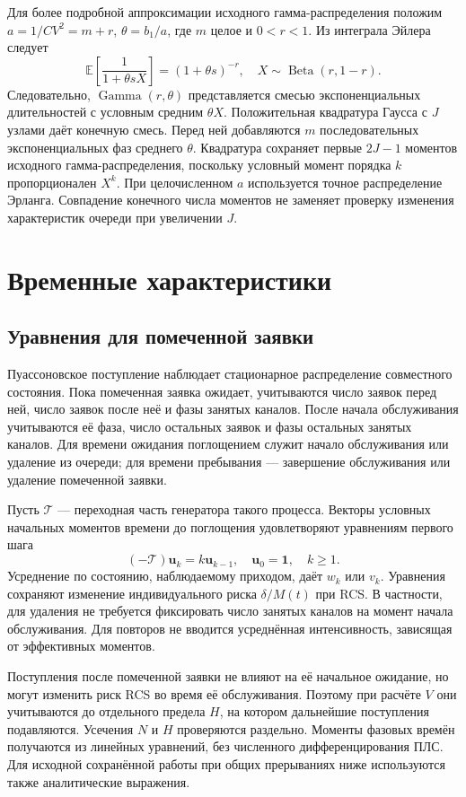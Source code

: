 \documentclass[a4paper,12pt]{article}
\begin{document}
Для более подробной аппроксимации исходного гамма-распределения положим \(a=1/CV^2=m+r\), \(\theta=b_1/a\), где \(m\) целое и \(0<r<1\). Из интеграла Эйлера \cite{nistdlmf} следует
\[
\mathbb E\!\left[\frac{1}{1+\theta sX}\right]=(1+\theta s)^{-r},\quad
X\sim\operatorname{Beta}(r,1-r).
\]
Следовательно, \(\operatorname{Gamma}(r,\theta)\) представляется смесью экспоненциальных длительностей с условным средним \(\theta X\). Положительная квадратура Гаусса с \(J\) узлами даёт конечную смесь. Перед ней добавляются \(m\) последовательных экспоненциальных фаз среднего \(\theta\). Квадратура сохраняет первые \(2J-1\) моментов исходного гамма-распределения, поскольку условный момент порядка \(k\) пропорционален \(X^k\). При целочисленном \(a\) используется точное распределение Эрланга. Совпадение конечного числа моментов не заменяет проверку изменения характеристик очереди при увеличении \(J\).

\section{Временные характеристики}\label{sec:times}
\subsection{Уравнения для помеченной заявки}
Пуассоновское поступление наблюдает стационарное распределение совместного состояния. Пока помеченная заявка ожидает, учитываются число заявок перед ней, число заявок после неё и фазы занятых каналов. После начала обслуживания учитываются её фаза, число остальных заявок и фазы остальных занятых каналов. Для времени ожидания поглощением служит начало обслуживания или удаление из очереди; для времени пребывания --- завершение обслуживания или удаление помеченной заявки.

Пусть \(\mathcal T\) --- переходная часть генератора такого процесса. Векторы условных начальных моментов времени до поглощения удовлетворяют уравнениям первого шага
\[
(-\mathcal T)\boldsymbol u_k=k\boldsymbol u_{k-1},\quad
\boldsymbol u_0=\mathbf1,\quad k\ge1.
\]
Усреднение по состоянию, наблюдаемому приходом, даёт \(w_k\) или \(v_k\). Уравнения сохраняют изменение индивидуального риска \(\delta/M(t)\) при RCS. В частности, для удаления не требуется фиксировать число занятых каналов на момент начала обслуживания. Для повторов не вводится усреднённая интенсивность, зависящая от эффективных моментов.

Поступления после помеченной заявки не влияют на её начальное ожидание, но могут изменить риск RCS во время её обслуживания. Поэтому при расчёте \(V\) они учитываются до отдельного предела \(H\), на котором дальнейшие поступления подавляются. Усечения \(N\) и \(H\) проверяются раздельно. Моменты фазовых времён получаются из линейных уравнений, без численного дифференцирования ПЛС. Для исходной сохранённой работы при общих прерываниях ниже используются также аналитические выражения.
\end{document}
